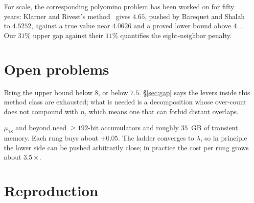 \documentclass[11pt]{article}
\begin{document}
For scale, the corresponding polyomino problem has been worked on for fifty
years: Klarner and Rivest's method~\cite{klarnerRivest1973} gives $4.65$, pushed
by Barequet and Shalah to $4.5252$, against a true value near $4.0626$ and a
proved lower bound above $4$~\cite{barequetRoteShalah2016}. Our $31\%$ upper gap
against their $11\%$ quantifies the eight-neighbor penalty.

\section{Open problems}

\begin{openproblem}
Bring the upper bound below $8$, or below $7.5$. \S\ref{sec:gap} says the levers
inside this method class are exhausted; what is needed is a decomposition whose
over-count does not compound with $n$, which means one that can forbid distant
overlaps.
\end{openproblem}

\begin{openproblem}
$\mu_{18}$ and beyond need $\ge 192$-bit accumulators and roughly $35$~GB of
transient memory. Each rung buys about $+0.05$. The ladder converges to
$\lambda$, so in principle the lower side can be pushed arbitrarily close; in
practice the cost per rung grows about $3.5\times$.
\end{openproblem}

\section{Reproduction}
\label{sec:repro}
\end{document}
